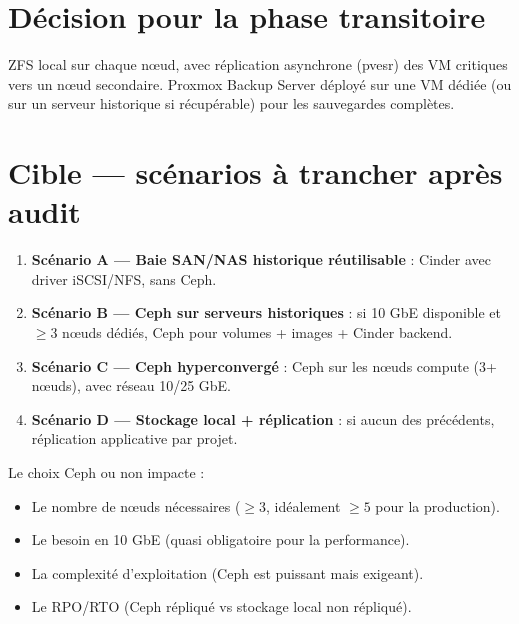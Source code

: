 \section{Décision pour la phase transitoire}
\begin{okbox}
ZFS local sur chaque nœud, avec réplication asynchrone (pvesr) des VM critiques vers un nœud secondaire. Proxmox Backup Server déployé sur une VM dédiée (ou sur un serveur historique si récupérable) pour les sauvegardes complètes.
\end{okbox}

\section{Cible — scénarios à trancher après audit}
\begin{enumerate}
  \item \textbf{Scénario A — Baie SAN/NAS historique réutilisable} : Cinder avec driver iSCSI/NFS, sans Ceph.
  \item \textbf{Scénario B — Ceph sur serveurs historiques} : si 10 GbE disponible et $\geq 3$ nœuds dédiés, Ceph pour volumes + images + Cinder backend.
  \item \textbf{Scénario C — Ceph hyperconvergé} : Ceph sur les nœuds compute (3+ nœuds), avec réseau 10/25 GbE.
  \item \textbf{Scénario D — Stockage local + réplication} : si aucun des précédents, réplication applicative par projet.
\end{enumerate}

\begin{warnbox}
Le choix Ceph ou non impacte :
\begin{itemize}
  \item Le nombre de nœuds nécessaires ($\geq 3$, idéalement $\geq 5$ pour la production).
  \item Le besoin en 10 GbE (quasi obligatoire pour la performance).
  \item La complexité d'exploitation (Ceph est puissant mais exigeant).
  \item Le RPO/RTO (Ceph répliqué vs stockage local non répliqué).
\end{itemize}
\end{warnbox}